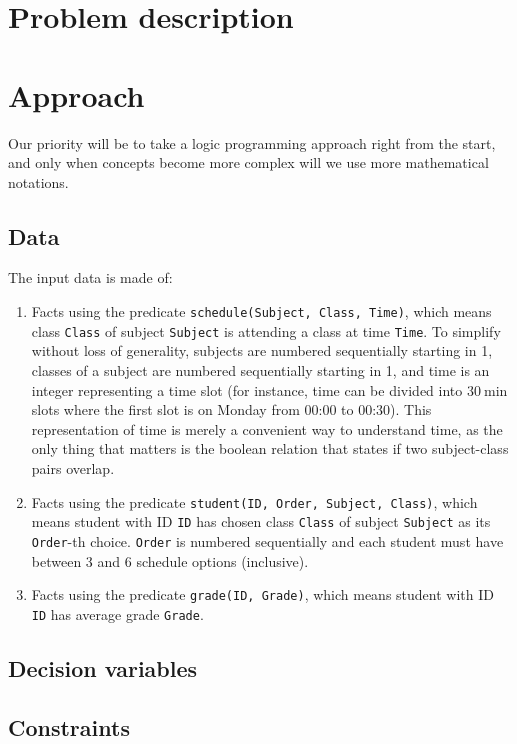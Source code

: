 \documentclass[runningheads]{llncs}
\begin{document}
\section{Problem description}

\section{Approach}

Our priority will be to take a logic programming approach right from the start, and only when concepts become more complex will we use more mathematical notations.

\subsection{Data}

The input data is made of:
\begin{enumerate}
    \item Facts using the predicate \texttt{schedule(Subject, Class, Time)}, which means class \texttt{Class} of subject \texttt{Subject} is attending a class at time \texttt{Time}. To simplify without loss of generality, subjects are numbered sequentially starting in 1, classes of a subject are numbered sequentially starting in 1, and time is an integer representing a time slot (for instance, time can be divided into $\SI{30}{\minute}$ slots where the first slot is on Monday from 00:00 to 00:30). This representation of time is merely a convenient way to understand time, as the only thing that matters is the boolean relation that states if two subject-class pairs overlap.
    \item Facts using the predicate \texttt{student(ID, Order, Subject, Class)}, which means student with ID \texttt{ID} has chosen class \texttt{Class} of subject \texttt{Subject} as its \texttt{Order}-th choice. \texttt{Order} is numbered sequentially and each student must have between 3 and 6 schedule options (inclusive).
    \item Facts using the predicate \texttt{grade(ID, Grade)}, which means student with ID \texttt{ID} has average grade \texttt{Grade}.
\end{enumerate}

\subsection{Decision variables}

\subsection{Constraints}
\end{document}

